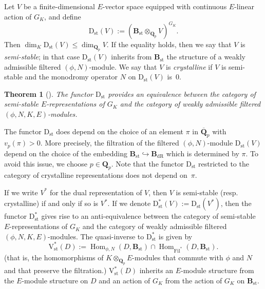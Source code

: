 \documentclass[11pt]{amsart}
\theoremstyle{definition}
\numberwithin{equation}{subsection}
\theoremstyle{plain}
\newtheorem{theo}[equation]{Theorem}
\theoremstyle{plain}
\theoremstyle{plain}
\theoremstyle{plain}
\theoremstyle{plain}
\theoremstyle{plain}
\theoremstyle{plain}
\theoremstyle{plain}
\theoremstyle{plain}
\theoremstyle{plain}
\theoremstyle{plain}
\theoremstyle{plain}
\theoremstyle{definition}
\theoremstyle{definition}
\theoremstyle{definition}
\theoremstyle{remark}
\renewcommand{\(}{\textup{(}}
\renewcommand{\)}{\textup{)}}
\DeclareMathOperator{\Hom}{Hom}
\newcommand{\Q}{\mathbf{Q}}
\newcommand{\Bst}{\mathbf{B}_{\mathrm{st}}}
\newcommand{\Bdr}{\mathbf{B}_{\mathrm{dR}}}
\newcommand{\Dst}{\mathrm{D}_{\mathrm{st}}}
\newcommand{\Fil}{\mathrm{Fil}}
\begin{document}
Let $V$ be a finite-dimensional $E$-vector space equipped with continuous $E$-linear action of $G_{K}$, and define $$\Dst(V):=(\Bst\otimes_{\Q_p}V)^{G_{K}}.$$  Then $\dim_{K}\Dst(V)\leq\dim_{\Q_p}V$.  If the equality holds, then we say that $V$ is \emph{semi-stable}; in that case $\Dst(V)$ inherits from $\Bst$ the structure of a weakly admissible filtered $(\phi,N)$-module. We say that $V$ is \emph{crystalline} if $V$ is semi-stable and the monodromy operator $N$ on $\Dst(V)$ is~$0$.
\begin{theo}[\cite{CF}]
The functor $\Dst$ provides an equivalence between the category of semi-stable $E$-representations of $G_{K}$ and the category of weakly admissible filtered $(\phi,N,K,E)$-modules.
\end{theo}

The functor $\Dst$ does depend on the choice of an element $\pi$ in $\overline{\Q}_p$ with $v_p(\pi)>0$. More precisely, the filtration of the filtered $(\phi,N)$-module $\Dst(V)$ depend on the choice of the embedding $\Bst\hookrightarrow\Bdr$ which is determined by $\pi$. To avoid this issue, we choose $p\in\Q_p$. Note that the functor $\Dst$ restricted to the category of crystalline representations does not depend on~$\pi$.


If we write $V^*$ for the dual representation of $V$, then $V$ is semi-stable (resp. crystalline) if and only if so is $V^*$. If we denote $\mathrm{D_{st}^{*}}(V):=\Dst(V^*)$, then the functor $\mathrm{D_{st}^{*}}$ gives rise to an anti-equivalence between the category of semi-stable $E$-representations of $G_{K}$ and the category of weakly admissible filtered $(\phi,N,K,E)$-modules. The quasi-inverse to $\mathrm{D^{*}_{st}}$ is given by $$\mathrm{V^{*}_{st}}(D):=\Hom_{\phi,N}(D,\Bst)\cap\Hom_{\Fil^{*}}(D, \Bst).$$ (that is, the homomorphisms of $K\otimes_{\Q_p} E$-modules that commute with $\phi$ and $N$ and that preserve the filtration.)
$\mathrm{V^{*}_{st}}(D)$ inherits an $E$-module structure from the $E$-module structure on $D$ and an action of $G_{K}$ from the action of $G_{K}$ on $\Bst$.
\end{document}
